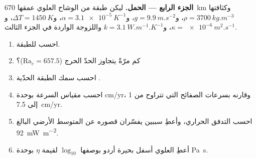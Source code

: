 \begin{problem}
\medskip\noindent\textbf{الجزء الرابع --- الحمل.} ليكن طبقة من الوشاح العلوي
عمقها \qty{670}{km} وكثافتها $\rho = \qty{3700}{kg.m^{-3}}$، و$g =
\qty{9.9}{m.s^{-2}}$، و$\alpha = \qty{3.1e-5}{K^{-1}}$، و$\Delta T =
\qty{1450}{K}$، و$\kappa = \qty{e-6}{m^2.s^{-1}}$، و$k = \qty{3.1}{W.m^{-1}.K^{-1}}$
واللزوجة الواردة في الجزء الثالث.
\begin{enumerate}[resume]
  \item احسب  للطبقة.
  \item كم مرّةً يتجاوز الحدّ الحرج ($\mathrm{Ra}_c = 657.5$)؟
  \item احسب سمك الطبقة الحدّية .
  \item احسب مقياس السرعة بوحدة \unit{cm/yr}، وقارنه بسرعات الصفائح
        التي تتراوح من 1 إلى \qty{7.5}{cm/yr}.
  \item احسب التدفق الحراري، وأعطِ سببين يفسّران قصوره عن
        المتوسط الأرضي البالغ \qty{92}{mW.m^{-2}}.
  \item أعطِ  العلوي أسفل بحيرة أردو بوصفها $\log_{10}$ لقيمة
        $\eta$ بوحدة \unit{Pa.s}.
\end{enumerate}
\end{problem}
